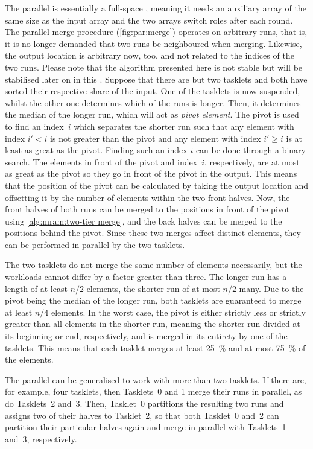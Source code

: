 The parallel \MS{} is essentially a full-space \MS{}, meaning it needs an auxiliary array of the same size as the input array and the two arrays switch roles after each round.
The parallel merge procedure (\cref{fig:par:merge}) operates on arbitrary runs, that is, it is no longer demanded that two runs be neighboured when merging.
Likewise, the output location is arbitrary now, too, and not related to the indices of the two runs.
Please note that the algorithm presented here is not stable but will be stabilised later on in this .
Suppose that there are but two tasklets and both have sorted their respective share of the input.
One of the tasklets is now suspended, whilst the other one determines which of the runs is longer.
Then, it determines the median of the longer run, which will act as \emph{pivot element}.
The pivot is used to find an index~\(i\) which separates the shorter run such that any element with index \(i' < i\) is not greater than the pivot and any element with index \(i' \ge i\) is at least as great as the pivot.
Finding such an index \(i\) can be done through a binary search.
The elements in front of the pivot and index~\(i\), respectively, are at most as great as the pivot so they go in front of the pivot in the output.
This means that the position of the pivot can be calculated by taking the output location and offsetting it by the number of elements within the two front halves.
Now, the front halves of both runs can be merged to the positions in front of the pivot using \cref{alg:mram:two-tier merge}, and the back halves can be merged to the positions behind the pivot.
Since these two merges affect distinct elements, they can be performed in parallel by the two tasklets.

The two tasklets do not merge the same number of elements necessarily, but the workloads cannot differ by a factor greater than three.
The longer run has a length of at least \(n/2\) elements, the shorter run of at most \(n/2\) many.
Due to the pivot being the median of the longer run, both tasklets are guaranteed to merge at least \(n/4\) elements.
In the worst case, the pivot is either strictly less or strictly greater than all elements in the shorter run, meaning the shorter run divided at its beginning or end, respectively, and is merged in its entirety by one of the tasklets.
This means that each tasklet merges at least \qty{25}{\percent} and at most \qty{75}{\percent} of the elements.

The parallel \MS{} can be generalised to work with more than two tasklets.
If there are, for example, four tasklets, then Tasklets~0 and 1 merge their runs in parallel, as do Tasklets~2 and~3.
Then, Tasklet~0 partitions the resulting two runs and assigns two of their halves to Tasklet~2, so that both Tasklet~0 and~2 can partition their particular halves again and merge in parallel with Tasklets~1 and~3, respectively.


